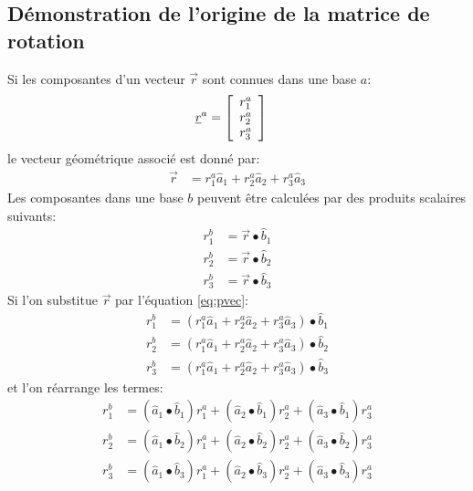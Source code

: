 \subsection{Démonstration de l'origine de la matrice de rotation}
Si les composantes d'un vecteur $\vec{r}$ sont connues dans une base $a$:
\begin{align}
	\underline{r}^a &= \left[ \begin{array}{c} r_1^a \\ r_2^a \\ r_3^a  \end{array} \right]
\end{align}
le vecteur géométrique associé est donné par:
\begin{align}
	\vec{r} &= r_1^a \hat{a}_1 + r_2^a \hat{a}_2 + r_3^a \hat{a}_3
	\label{eq:pvec}
\end{align}
Les composantes dans une base $b$ peuvent être calculées par des produits scalaires suivants:
\begin{align}
	r_1^b &= \vec{r} \bullet \hat{b}_1 \\
	r_2^b &= \vec{r} \bullet \hat{b}_2 \\
	r_3^b &= \vec{r} \bullet \hat{b}_3
\end{align}
Si l'on substitue $\vec{r}$ par l'équation \eqref{eq:pvec}:
\begin{align}
	r_1^b &= (r_1^a \hat{a}_1 + r_2^a \hat{a}_2 + r_3^a \hat{a}_3) \bullet \hat{b}_1 \\
	r_2^b &= (r_1^a \hat{a}_1 + r_2^a \hat{a}_2 + r_3^a \hat{a}_3) \bullet \hat{b}_2 \\
	r_3^b &= (r_1^a \hat{a}_1 + r_2^a \hat{a}_2 + r_3^a \hat{a}_3) \bullet \hat{b}_3
\end{align}
et l'on réarrange les termes:
\begin{align}
	r_1^b &= (\hat{a}_1 \bullet \hat{b}_1 ) r_1^a + (\hat{a}_2 \bullet \hat{b}_1 ) r_2^a + (\hat{a}_3 \bullet \hat{b}_1 ) r_3^a \\
	r_2^b &= (\hat{a}_1 \bullet \hat{b}_2 ) r_1^a + (\hat{a}_2 \bullet \hat{b}_2 ) r_2^a + (\hat{a}_3 \bullet \hat{b}_2 ) r_3^a \\
	r_3^b &= (\hat{a}_1 \bullet \hat{b}_3 ) r_1^a + (\hat{a}_2 \bullet \hat{b}_3 ) r_2^a + (\hat{a}_3 \bullet \hat{b}_3 ) r_3^a
\end{align}
